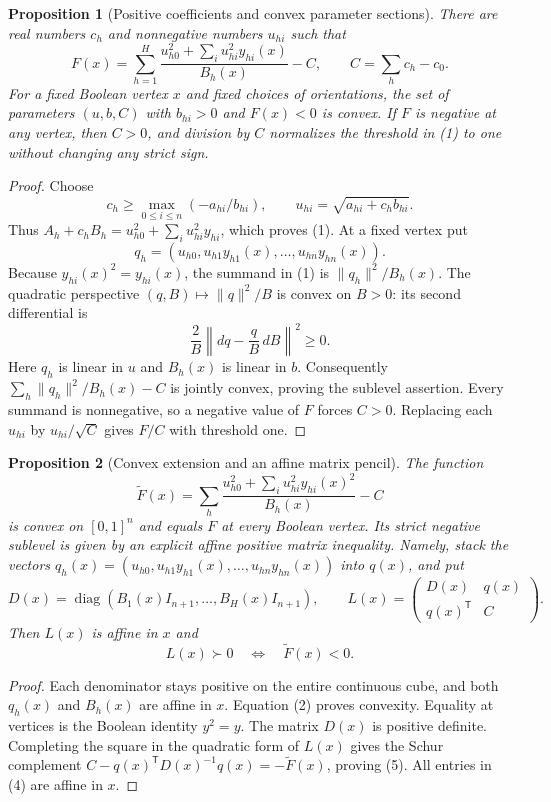 \documentclass[11pt]{article}
\newtheorem{proposition}{Proposition}
\begin{document}
\begin{proposition}[Positive coefficients and convex parameter sections]
There are real numbers $c_h$ and nonnegative numbers $u_{hi}$ such that
\[
 F(x)=\sum_{h=1}^H
 \frac{u_{h0}^2+\sum_i u_{hi}^2 y_{hi}(x)}{B_h(x)}-C,
 \qquad C=\sum_h c_h-c_0.
 \tag{1}
\]
For a fixed Boolean vertex $x$ and fixed choices of orientations, the
set of parameters $(u,b,C)$ with $b_{hi}>0$ and $F(x)<0$ is convex.
If $F$ is negative at any vertex, then $C>0$, and division by $C$
normalizes the threshold in (1) to one without changing any strict sign.
\end{proposition}
\begin{proof}
Choose
\[
 c_h\geq\max_{0\leq i\leq n}(-a_{hi}/b_{hi}),\qquad
 u_{hi}=\sqrt{a_{hi}+c_hb_{hi}}.
\]
Thus $A_h+c_hB_h=u_{h0}^2+\sum_i u_{hi}^2y_{hi}$, which proves (1).
At a fixed vertex put
\[
 q_h=(u_{h0},u_{h1}y_{h1}(x),\ldots,u_{hn}y_{hn}(x)).
\]
Because $y_{hi}(x)^2=y_{hi}(x)$, the summand in (1) is
$\|q_h\|^2/B_h(x)$. The quadratic perspective $(q,B)\mapsto\|q\|^2/B$
is convex on $B>0$: its second differential is
\[
 \frac{2}{B}\left\|dq-\frac{q}{B}\,dB\right\|^2\geq0.
 \tag{2}
\]
Here $q_h$ is linear in $u$ and $B_h(x)$ is linear in $b$.
Consequently $\sum_h\|q_h\|^2/B_h(x)-C$ is jointly convex, proving
the sublevel assertion. Every summand is nonnegative, so a negative
value of $F$ forces $C>0$. Replacing each $u_{hi}$ by $u_{hi}/\sqrt C$
gives $F/C$ with threshold one.
\end{proof}

\begin{proposition}[Convex extension and an affine matrix pencil]
The function
\[
 \widetilde F(x)=\sum_h
 \frac{u_{h0}^2+\sum_i u_{hi}^2y_{hi}(x)^2}{B_h(x)}-C
 \tag{3}
\]
is convex on $[0,1]^n$ and equals $F$ at every Boolean vertex.
Its strict negative sublevel is given by an explicit affine positive
matrix inequality. Namely, stack the vectors
$q_h(x)=(u_{h0},u_{h1}y_{h1}(x),\ldots,u_{hn}y_{hn}(x))$ into $q(x)$,
and put
\[
 D(x)=\operatorname{diag}(B_1(x)I_{n+1},\ldots,B_H(x)I_{n+1}),
 \qquad
 L(x)=\begin{pmatrix}D(x)&q(x)\\q(x)^{\mathsf T}&C\end{pmatrix}.
 \tag{4}
\]
Then $L(x)$ is affine in $x$ and
\[
             L(x)\succ0\quad\Longleftrightarrow\quad
             \widetilde F(x)<0.
 \tag{5}
\]
\end{proposition}
\begin{proof}
Each denominator stays positive on the entire continuous cube, and
both $q_h(x)$ and $B_h(x)$ are affine in $x$. Equation (2) proves
convexity. Equality at vertices is the Boolean identity $y^2=y$.
The matrix $D(x)$ is positive definite. Completing the square in the
quadratic form of $L(x)$ gives the Schur complement
$C-q(x)^{\mathsf T}D(x)^{-1}q(x)=-\widetilde F(x)$, proving (5).
All entries in (4) are affine in $x$.
\end{proof}
\end{document}
